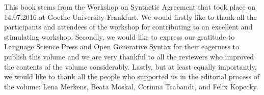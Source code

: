 \begin{refsection}

This book stems from the Workshop on Syntactic Agreement that took place on 14.07.2016 at Goethe-University Frankfurt.  We would firstly like to thank all the participants and attendees of the workshop for contributing to an excellent and stimulating workshop. Secondly, we would like to express our gratitude to Language Science Press and Open Generative Syntax for their eagerness to publish this volume and we are very thankful to all the reviewers who improved the contents of the volume considerably. Lastly, but at least equally importantly, we would like to thank all the people who supported us in the editorial  process of the volume: Lena Merkens, Beata Moskal, Corinna Trabandt, and Felix Kopecky.

\printbibliography[heading=subbibliography]
\end{refsection}

